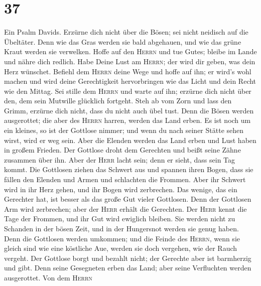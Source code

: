 \hypertarget{section-36}{%
\section{37}\label{section-36}}

 Ein Psalm Davids. Erzürne dich nicht über die Bösen; sei
nicht neidisch auf die Übeltäter.  Denn wie das Gras
werden sie bald abgehauen, und wie das grüne Kraut werden sie verwelken.
 Hoffe auf den \textsc{Herrn} und tue Gutes; bleibe im
Lande und nähre dich redlich.  Habe Deine Lust am
\textsc{Herrn}; der wird dir geben, was dein Herz wünschet.
 Befiehl dem \textsc{Herrn} deine Wege und hoffe auf ihn;
er wird's wohl machen  und wird deine Gerechtigkeit
hervorbringen wie das Licht und dein Recht wie den Mittag.
 Sei stille dem \textsc{Herrn} und warte auf ihn; erzürne
dich nicht über den, dem sein Mutwille glücklich fortgeht.
 Steh ab vom Zorn und lass den Grimm, erzürne dich nicht,
dass du nicht auch übel tust.  Denn die Bösen werden
ausgerottet; die aber des \textsc{Herrn} harren, werden das Land erben.
 Es ist noch um ein kleines, so ist der Gottlose nimmer;
und wenn du nach seiner Stätte sehen wirst, wird er weg sein.
 Aber die Elenden werden das Land erben und Lust haben in
großem Frieden.  Der Gottlose droht dem Gerechten und
beißt seine Zähne zusammen über ihn.  Aber der
\textsc{Herr} lacht sein; denn er sieht, dass sein Tag kommt.
 Die Gottlosen ziehen das Schwert aus und spannen ihren
Bogen, dass sie fällen den Elenden und Armen und schlachten die Frommen.
 Aber ihr Schwert wird in ihr Herz gehen, und ihr Bogen
wird zerbrechen.  Das wenige, das ein Gerechter hat, ist
besser als das große Gut vieler Gottlosen.  Denn der
Gottlosen Arm wird zerbrechen; aber der \textsc{Herr} erhält die
Gerechten.  Der \textsc{Herr} kennt die Tage der Frommen,
und ihr Gut wird ewiglich bleiben.  Sie werden nicht zu
Schanden in der bösen Zeit, und in der Hungersnot werden sie genug
haben.  Denn die Gottlosen werden umkommen; und die
Feinde des \textsc{Herrn}, wenn sie gleich sind wie eine köstliche Aue,
werden sie doch vergehen, wie der Rauch vergeht.  Der
Gottlose borgt und bezahlt nicht; der Gerechte aber ist barmherzig und
gibt.  Denn seine Gesegneten erben das Land; aber seine
Verfluchten werden ausgerottet.  Von dem \textsc{Herrn}
